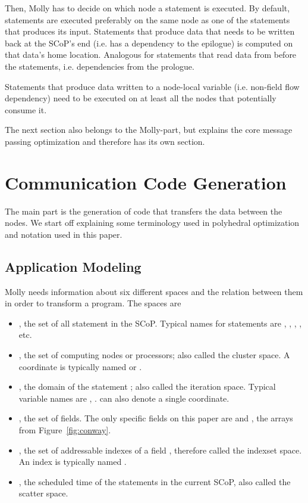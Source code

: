 \documentclass{sigplanconf}
\begin{document}
Then, Molly has to decide on which node a statement is executed. By default, statements are executed preferably on the same node as one of the statements that produces its input. Statements that produce data that needs to be written back at the SCoP's end (i.e. has a dependency to the epilogue) is computed on that data's home location. Analogous for statements that read data from before the statements, i.e. dependencies from the prologue.

Statements that produce data written to a node-local variable (i.e. non-field flow dependency) need to be executed on at least all the nodes that potentially consume it. 

The next section also belongs to the Molly-part, but explains the core message passing optimization and therefore has its own section. 


\section{Communication Code Generation}\label{sct:communication}

The main part is the generation of code that transfers the data between the nodes. We start off explaining some terminology used in polyhedral optimization and notation used in this paper.



\subsection{Application Modeling}

Molly needs information about six different spaces and the relation between them in order to transform a program. The spaces are

\begin{itemize}
\item , the set of all statement in the SCoP. Typical names for statements are , , , ,  etc.
\item , the set of computing nodes or processors; also called the cluster space. A coordinate is typically named  or .
\item , the domain of the statement ; also called the iteration space. 
Typical variable names are , .  can also denote a single coordinate.
\item , the set of fields. The only specific fields on this paper are  and , the arrays from Figure~\ref{fig:conway}.
\item , the set of addressable indexes of a field , therefore called the indexset space. An index is typically named .
\item , the scheduled time of the statements in the current SCoP, also called the scatter space.
\end{itemize}
\end{document}
